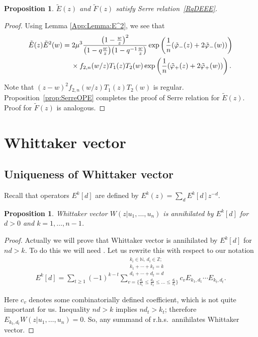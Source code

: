 \documentclass[pdftex]{sigma}
\numberwithin{equation}{section}
\newtheorem{Proposition}[Theorem]{Proposition}
\theoremstyle{definition}
\newcommand{\tE}{\tilde{E}}
\newcommand{\tF}{\tilde{F}}
\newcommand{\tphi}{\tilde{\varphi}}
\begin{document}
\begin{Proposition}$\tE(z)$ and $\tF(z)$ satisfy Serre relation~\eqref{RqDEEE}.
\end{Proposition}

\begin{proof}Using Lemma \ref{App:Lemma:E^2}, we see that
\begin{gather*}
\tE (z) \tE^2(w) = 2\mu^3 \frac{ \big(1-\frac{w}{z}\big)^{2}}{ \big(1-q\frac{w}{z}\big) \big(1-q^{-1}\frac{w}{z}\big)}\exp \left( \frac{1}{n} ( \tphi_-(z) + 2 \tphi_- (w) ) \right) \\
\hphantom{\tE (z) \tE^2(w) =}{}\times f_{2,n}(w/z) T_{1}(z) T_{2} (w) \exp \left( \frac{1}{n} ( \tphi_+(z) + 2 \tphi_+ (w) ) \right).
\end{gather*}

Note that $(z-w)^2 f_{2,n}(w/z) T_{1}(z) T_{2} (w)$ is regular. Proposition~\ref{prop:SerreOPE} completes the proof of Serre relation for $\tE(z)$. Proof for $\tF(z)$ is analogous.
\end{proof}

\section{Whittaker vector} \label{Appendix:Whittaker}

\subsection{Uniqueness of Whittaker vector}
Recall that operators $E^k[d]$ are defined by $E^k(z) = \sum_d E^k[d] z^{-d}$.
\begin{Proposition}
Whittaker vector $W(z|u_1, \dots, u_n)$ is annihilated by $E^k[d]$ for $d>0$ and $k=1, \dots, n-1$.
\end{Proposition}

\begin{proof}
Actually we will prove that Whittaker vector is annihilated by $E^k[d]$ for $nd >k$. To do this we will need \cite[equation~(7.17)]{N16}. Let us rewrite this with respect to our notation
\begin{gather}
E^k[d] = \sum_{t \geqslant 1} (-1)^{k-t} \sum_{v= \{ \frac{d_1}{k_1} \leqslant \frac{d_2}{k_2} \leqslant \dots \leqslant \frac{d_t}{k_t} \} }^{\substack{k_i \in \mathbb{N}, \ d_i \in \mathbb{Z};\\k_1 + \cdots + k_t = k\\ d_1 + \cdots + d_t = d}} c_v E_{k_1,d_1} \cdots E_{k_t, d_t}. \label{Negut formula}
\end{gather}

Here $c_v$ denotes some combinatorially defined coefficient, which is not quite important for us. Inequality $nd >k$ implies $nd_t > k_t$; therefore $E_{k_t, d_t} W(z|u_1, \dots, u_n) =0$. So, any summand of r.h.s.\ annihilates Whittaker vector.
\end{proof}
\end{document}
